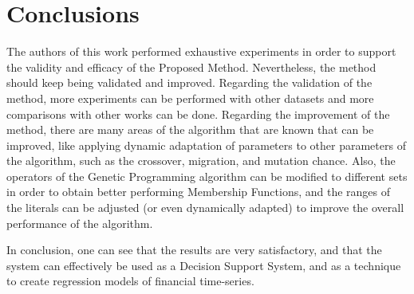 \section{Conclusions}
\label{conclusions}

The authors of this work performed exhaustive experiments in order to support the validity and efficacy of the Proposed Method. Nevertheless, the method should keep being validated and improved. Regarding the validation of the method, more experiments can be performed with other datasets and more comparisons with other works can be done. Regarding the improvement of the method, there are many areas of the algorithm that are known that can be improved, like applying dynamic adaptation of parameters to other parameters of the algorithm, such as the crossover, migration, and mutation chance. Also, the operators of the Genetic Programming algorithm can be modified to different sets in order to obtain better performing Membership Functions, and the ranges of the literals can be adjusted (or even dynamically adapted) to  improve the overall performance of the algorithm.

In conclusion, one can see that the results are very satisfactory, and that the system can effectively be used as a Decision Support System, and as a technique to create regression models of financial time-series.
  
  
  